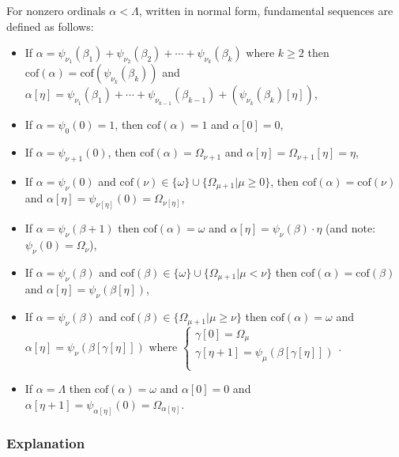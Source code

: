 \documentclass[10pt]{article}
\begin{document}
For nonzero ordinals \(\alpha<\Lambda\), written in normal form, fundamental sequences are defined as follows:

\begin{itemize}
     \setlength{\itemsep}{1pt}
     \setlength{\parskip}{0pt}
     \setlength{\parsep}{0pt}
\item If \(\alpha=\psi_{\nu_1}(\beta_1)+\psi_{\nu_2}(\beta_2)+\cdots+\psi_{\nu_k}(\beta_k)\) where \(k\geq2\) then \(\text{cof}(\alpha)=\text{cof}(\psi_{\nu_k}(\beta_k))\) and \(\alpha[\eta]=\psi_{\nu_1}(\beta_1)+\cdots+\psi_{\nu_{k-1}}(\beta_{k-1})+(\psi_{\nu_k}(\beta_k)[\eta])\),
\item If \(\alpha=\psi_{0}(0)=1\), then \(\text{cof}(\alpha)=1\) and \(\alpha[0]=0\),
\item If \(\alpha=\psi_{\nu+1}(0)\), then \(\text{cof}(\alpha)=\Omega_{\nu+1}\) and \(\alpha[\eta]=\Omega_{\nu+1}[\eta]=\eta\),
\item If \(\alpha=\psi_{\nu}(0)\) and \(\text{cof}(\nu)\in\{\omega\}\cup\{\Omega_{\mu+1}|\mu\geq 0\}\), then \(\text{cof}(\alpha)=\text{cof}(\nu)\) and \(\alpha[\eta]=\psi_{\nu[\eta]}(0)=\Omega_{\nu[\eta]}\),
\item If \(\alpha=\psi_{\nu}(\beta+1)\) then \(\text{cof}(\alpha)=\omega\) and \(\alpha[\eta]=\psi_{\nu}(\beta)\cdot \eta\) (and note: \(\psi_\nu(0)=\Omega_\nu\)),
\item If \(\alpha=\psi_{\nu}(\beta)\) and \(\text{cof}(\beta)\in\{\omega\}\cup\{\Omega_{\mu+1}|\mu<\nu\}\) then \(\text{cof}(\alpha)=\text{cof}(\beta)\) and \(\alpha[\eta]=\psi_{\nu}(\beta[\eta])\),
\item If \(\alpha=\psi_{\nu}(\beta)\) and \(\text{cof}(\beta)\in\{\Omega_{\mu+1}|\mu\geq\nu\}\) then \(\text{cof}(\alpha)=\omega\) and \(\alpha[\eta]=\psi_{\nu}(\beta[\gamma[\eta]])\) where \(\left\{\begin{array}{lcr} \gamma[0]=\Omega_\mu \\ \gamma[\eta+1]=\psi_\mu(\beta[\gamma[\eta]])\\ \end{array}\right.\).
\item If \(\alpha=\Lambda\) then \(\text{cof}(\alpha)=\omega\) and \(\alpha[0]=0\) and \(\alpha[\eta+1]=\psi_{\alpha[\eta]}(0)=\Omega_{\alpha[\eta]}\).
\end{itemize}

\subsubsection{Explanation}
\end{document}
